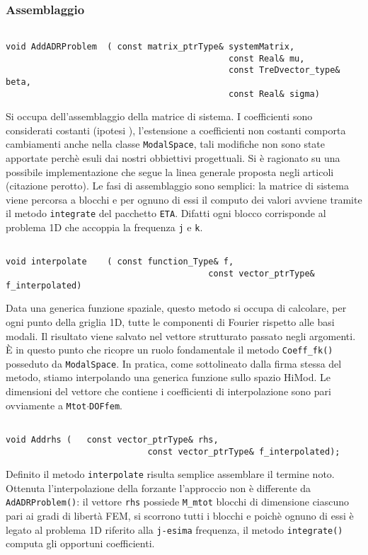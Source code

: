 \subsubsection{Assemblaggio}
\begin{lstlisting}[style=general, frame = top]

void AddADRProblem	( const matrix_ptrType& systemMatrix,
											const Real& mu, 
											const TreDvector_type& beta, 
											const Real& sigma)
\end{lstlisting}
Si occupa dell'assemblaggio della matrice di sistema. I coefficienti sono considerati costanti (ipotesi ), l'estensione a coefficienti non costanti comporta cambiamenti anche nella classe \texttt{ModalSpace}, tali modifiche non sono state apportate perch\`e esuli dai nostri obbiettivi progettuali. Si \`e ragionato su una possibile implementazione che segue la linea generale proposta negli articoli (citazione perotto).
Le fasi di assemblaggio sono semplici: la matrice di sistema viene percorsa a blocchi e per ognuno di essi il computo dei valori avviene tramite il metodo \texttt{integrate} del pacchetto \texttt{ETA}. Difatti ogni blocco corrisponde al problema 1D che accoppia la frequenza \texttt{j} e \texttt{k}.

\begin{lstlisting}[style = general, frame = top]

void interpolate	( const function_Type& f,
										const vector_ptrType& f_interpolated)
\end{lstlisting}
Data una generica funzione spaziale, questo metodo si occupa di calcolare, per ogni punto della griglia 1D, tutte le componenti di Fourier rispetto alle basi modali. Il risultato viene salvato nel vettore strutturato passato negli argomenti. \`E in questo punto che ricopre un ruolo fondamentale il metodo \texttt{Coeff\_fk()} posseduto da \texttt{ModalSpace}.
In pratica, come sottolineato dalla firma stessa del metodo, stiamo interpolando una generica funzione sullo spazio HiMod. Le dimensioni del vettore che contiene i coefficienti di interpolazione sono pari ovviamente a \texttt{Mtot$\cdot$DOFfem}.

\begin{lstlisting}[style=general, frame = top]

void Addrhs	(	const vector_ptrType& rhs,
							const vector_ptrType& f_interpolated);
\end{lstlisting}
Definito il metodo \texttt{interpolate} risulta semplice assemblare il termine noto. Ottenuta l'interpolazione della forzante l'approccio non \`e differente da \texttt{AdADRProblem()}: il vettore \texttt{rhs} possiede \texttt{M\_mtot} blocchi di dimensione ciascuno pari ai gradi di libert\`a FEM, si scorrono tutti i blocchi e poich\`e ognuno di essi \`e legato al problema 1D riferito alla \texttt{j-esima} frequenza, il metodo \texttt{integrate()} computa gli opportuni coefficienti.

